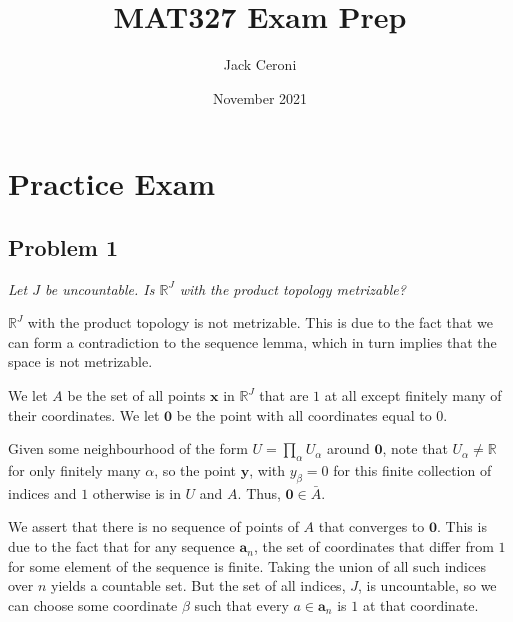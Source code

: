 \documentclass[10pt, oneside]{amsart}
\title{MAT327 Exam Prep}
\author{Jack Ceroni}
\date{November 2021}
\newcommand{\bm}{\boldsymbol}
\begin{document}
    \maketitle

    \tableofcontents

    \vspace{.25in}

    \newpage

    \section{Practice Exam}

    \hrulefill

    \subsection{Problem 1} \textit{Let $J$ be uncountable. Is $\mathbb{R}^{J}$ with the product topology metrizable?}
    \newline

    $\mathbb{R}^{J}$ with the product topology is not metrizable. This is due to the fact that we can form a contradiction to the sequence lemma, which in
    turn implies that the space is not metrizable.
    \newline

    We let $A$ be the set of all points $\bm{x}$ in $\mathbb{R}^J$ that are $1$ at all except finitely many of their coordinates. We let $\bm{0}$ be the point
    with all coordinates equal to $0$.
    \newline

    Given some neighbourhood of the form $U = \prod_{\alpha} U_{\alpha}$ around $\bm{0}$, note that $U_{\alpha} \neq \mathbb{R}$ for only finitely many $\alpha$, so the point $\bm{y}$,
    with $y_{\beta} = 0$ for this finite collection of indices and $1$ otherwise is in $U$ and $A$. Thus, $\bm{0} \in \bar{A}$.
    \newline

    We assert that there is no sequence of points of $A$ that converges to $\bm{0}$. This is due to the fact that for any sequence $\bm{a}_n$, the set of coordinates that differ from $1$
    for some element of the sequence is finite. Taking the union of all such indices over $n$ yields a countable set. But the set of all indices, $J$, is uncountable, so we can choose some
    coordinate $\beta$ such that every $a \in \bm{a}_n$ is $1$ at that coordinate.
    \newline
\end{document}
